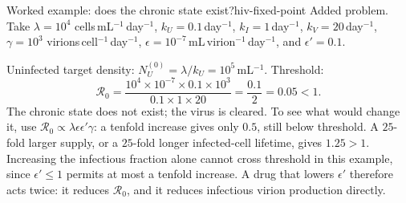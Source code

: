 \begin{example}[unbreakable,fontupper=\small]{Worked example: does the chronic state exist?}{hiv-fixed-point}
Added problem. Take $\lambda=10^4$ cells\,mL$^{-1}$\,day$^{-1}$, $k_U=0.1$\,day$^{-1}$, $k_I=1$\,day$^{-1}$, $k_V=20$\,day$^{-1}$, $\gamma=10^3$ virions\,cell$^{-1}$\,day$^{-1}$, $\epsilon=10^{-7}$\,mL\,virion$^{-1}$\,day$^{-1}$, and $\epsilon'=0.1$.

Uninfected target density: $N_U^{(0)}=\lambda/k_U=10^5$\,mL$^{-1}$. Threshold:
\begin{equation}\label{eq:lec02:worked-R0}
\mathcal R_0=\frac{10^4\times10^{-7}\times0.1\times10^3}
{0.1\times1\times20}=\frac{0.1}{2}=0.05<1.
\end{equation}
The chronic state does not exist; the virus is cleared. To see what would change it, use $\mathcal R_0\propto\lambda\epsilon\epsilon'\gamma$: a tenfold increase gives only $0.5$, still below threshold. A $25$-fold larger supply, or a $25$-fold longer infected-cell lifetime, gives $1.25>1$. Increasing the infectious fraction alone cannot cross threshold in this example, since $\epsilon'\leq1$ permits at most a tenfold increase. A drug that lowers $\epsilon'$ therefore acts twice: it reduces $\mathcal R_0$, and it reduces infectious virion production directly.
\end{example}


